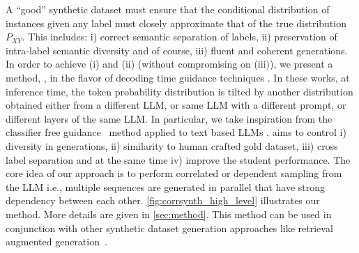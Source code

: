 A ``good'' synthetic dataset must ensure that the conditional distribution of instances given any label must closely approximate that of the true distribution $P_{XY}$. This includes: i) correct semantic separation of labels, ii) preservation of intra-label semantic diversity and of course, iii) fluent and coherent generations. In order to achieve (i) and (ii) (without compromising on (iii)), we present a method, \corrsyn{}, in the flavor of decoding time guidance techniques \cite{li2023contrastive,o2023contrastive,sanchez2023stay,chuang2023dola}. In these works, at inference time, the token probability distribution is tilted by another distribution obtained either from a different LLM, or same LLM with a different prompt, or different layers of the same LLM. In particular, we take inspiration from the classifier free guidance~\cite{ho2021classifierfree} method applied to text based LLMs \cite{sanchez2023stay}. 
\corrsyn{} aims to control i) diversity in generations, ii) similarity to human crafted gold dataset, iii) cross label separation and at the same time iv) improve the student performance. The core idea of our approach is to perform correlated or dependent sampling from the LLM i.e., multiple sequences are generated in parallel that have strong dependency between each other. \autoref{fig:corrsynth_high_level} illustrates our method. More details are given in \autoref{sec:method}. This method can be used in conjunction with other synthetic dataset generation approaches like retrieval augmented generation~\cite{lewis2020retrieval}.

